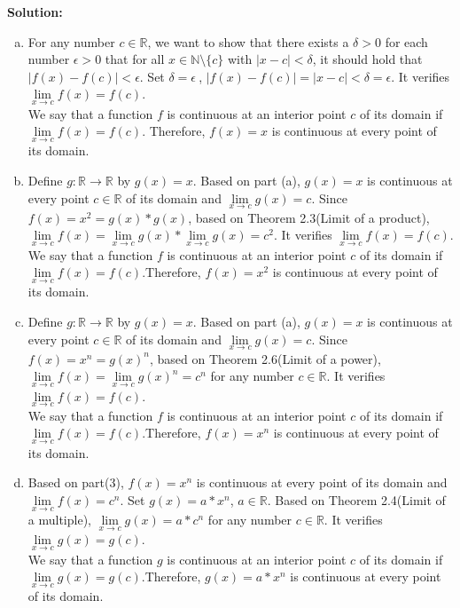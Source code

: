 \documentclass[11pt,a4paper]{article}
\begin{document}
\begin{enumerate}[(a)]
\noindent\textbf{\textbf{Solution:}}\\
\begin{enumerate}[a)]
	\item For any number $c \in \mathbb{R}$, we want to show that there exists a $\delta > 0$ for each number $\epsilon >0 $ that for all $x \in \mathbb{N}\setminus \{c\}$ with $|x-c|<\delta$, it should hold that $|f(x)-f(c)|< \epsilon$. Set $  \delta=\epsilon \ $, $|f(x)-f(c)|=|x-c|<\delta = \epsilon$. It verifies $\underset{x \to c}{\lim} f(x)= f(c) $.  \\We say that a function $f$ is continuous at an interior point $c$ of its domain if  $\underset{x \to c}{\lim} f(x)= f(c) $. Therefore, $f(x) = x$ is continuous at every point of its domain.
	\item Define $g:\mathbb{R} \to \mathbb{R}$ by $g(x) = x$. Based on part 
(a), $g(x) = x$ is continuous at every point $c \in \mathbb{R}$ of its domain and $\underset{x \to c}{\lim} g(x)= c$. Since $f(x) = x^2 = g(x) * g(x)$, based on Theorem 2.3(Limit of a product), $\underset{x \to c}{\lim} f(x)= \underset{x \to c}{\lim} g(x) * \underset{x \to c}{\lim} g(x) = c^2$. It verifies $\underset{x \to c}{\lim} f(x)= f(c) $.  \\We say that a function $f$ is continuous at an interior point $c$ of its domain if  $\underset{x \to c}{\lim} f(x)= f(c) $.Therefore, $f(x) = x^2$ is continuous at every point of its domain.
	\item Define $g:\mathbb{R} \to \mathbb{R}$ by $g(x) = x$. Based on part 
(a), $g(x) = x$ is continuous at every point $c \in \mathbb{R}$ of its domain and $\underset{x \to c}{\lim} g(x)= c$. Since $f(x) = x^n = g(x)^n$, based on Theorem 2.6(Limit of a power), $\underset{x \to c}{\lim} f(x)= \underset{x \to c}{\lim} g(x) ^n= c^n$ for any number $c \in \mathbb{R}$. It verifies $\underset{x \to c}{\lim} f(x)= f(c) $. \\ We say that a function $f$ is continuous at an interior point $c$ of its domain if  $\underset{x \to c}{\lim} f(x)= f(c) $.Therefore, $f(x) = x^n$ is continuous at every point of its domain.
	\item Based on part(3), $f(x) = x^n$ is continuous at every point of its domain and $\underset{x \to c}{\lim} f(x)= c^n$. Set $g(x) = a  * x^n$, $a \in \mathbb{R}$. Based on Theorem 2.4(Limit of a multiple), $\underset{x \to c}{\lim} g(x)= a * c^n$ for any number $c \in \mathbb{R}$. It verifies $\underset{x \to c}{\lim} g(x)= g(c) $. \\ We say that a function $g$ is continuous at an interior point $c$ of its domain if  $\underset{x \to c}{\lim} g(x)= g(c) $.Therefore, $g(x) = a  * x^n$ is continuous at every point of its domain.\\
	

\end{enumerate}
\end{enumerate}
\end{document}
